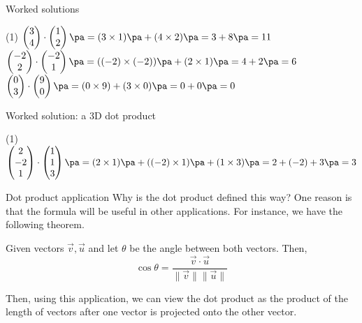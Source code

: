 \begin{frame}[t]{Worked solutions}\small
\begin{sol}
\begin{tasks}(1)
\task $\begin{pmatrix}3 \\ 4\end{pmatrix} \cdot \begin{pmatrix}1 \\ 2\end{pmatrix} \pa = (3 \times 1) \pa + (4 \times 2) \pa = 3 + 8 \pa = 11$ \pa
\task $\begin{pmatrix}-2 \\ 2\end{pmatrix} \cdot \begin{pmatrix}-2 \\ 1\end{pmatrix} \pa = ((-2) \times (-2)) \pa + (2 \times 1) \pa = 4 + 2 \pa = 6$ \pa
\task  $\begin{pmatrix}0 \\ 3\end{pmatrix} \cdot \begin{pmatrix}9 \\ 0\end{pmatrix} \pa = (0 \times 9) + (3 \times 0) \pa = 0 + 0 \pa = 0$ \pa
\end{tasks}
\end{sol}
\end{frame}

\begin{frame}[t]{Worked solution: a 3D dot product}\small
\begin{sol}
\begin{tasks}(1)
\task $\begin{pmatrix}2 \\ -2 \\ 1\end{pmatrix} \cdot \begin{pmatrix}1 \\ 1 \\ 3\end{pmatrix} \pa = (2 \times 1) \pa + ((-2) \times 1) \pa + (1 \times 3) \pa = 2 + (-2) + 3 \pa = 3$
\end{tasks}
\end{sol}
\end{frame}

\begin{frame}{Dot product application}
Why is the dot product defined this way? One reason is that the formula will be useful in other applications. For instance, we have the following theorem.

\begin{thm}{}{}
Given vectors $\vec{v}, \vec{u}$ and let $\theta$ be the angle between both vectors. Then,
\[ \cos \theta = \frac{\vec{v} \cdot \vec{u}}{\| \vec{v} \| \| \vec{u} \|}\]
\end{thm}

Then, using this application, we can view the dot product as the product of the length of vectors after one vector is projected onto the other vector.
\end{frame}

